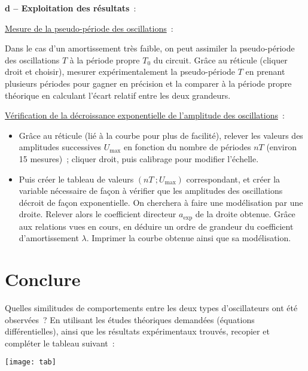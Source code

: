 \documentclass[a4paper, 11pt, final, garamond]{book}
\begin{document}
\textbf{d  -- Exploitation des résultats}~:

\medskip

\underline{Mesure de la pseudo-période des oscillations}~:

Dans le cas d'un amortissement très faible, on peut assimiler la pseudo-période des oscillations $T$ à la période propre $T_0$ du circuit. Grâce au réticule (cliquer droit et choisir),  mesurer expérimentalement la pseudo-période $T$ en prenant plusieurs périodes pour gagner en précision et la comparer à la période propre théorique en calculant l'écart relatif entre les deux grandeurs.

\medskip

\underline{Vérification de la décroissance exponentielle de l'amplitude des
oscillations}~:

\begin{itemize}
    \item Grâce au réticule (lié à la courbe pour plus de facilité), relever les
        valeurs des amplitudes successives $U_{\max}$ en fonction du nombre de
        périodes $nT$ (environ 15 mesures)~; cliquer droit, puis calibrage pour
        modifier l'échelle.
    \item Puis créer le tableau de valeurs $(nT~; U_{\max})$ correspondant, et
        créer la variable nécessaire de façon à vérifier que les amplitudes des
        oscillations décroit de façon exponentielle. On cherchera à faire une
        modélisation par une droite. Relever alors le coefficient directeur
        $a_{\exp}$ de la droite obtenue. Grâce aux relations vues en cours, en
        déduire un ordre de grandeur du coefficient d'amortissement $\lambda$.
        Imprimer la courbe obtenue ainsi que sa modélisation.
\end{itemize}

%
%

\section{Conclure}

Quelles similitudes de comportements entre les deux types d'oscillateurs ont été
observées~? En utilisant les études théoriques demandées (équations
différentielles), ainsi que les résultats expérimentaux trouvés, recopier et
compléter le tableau suivant~:

\begin{center}
    \texttt{[image: tab]}
\end{center}
  
\end{document}
